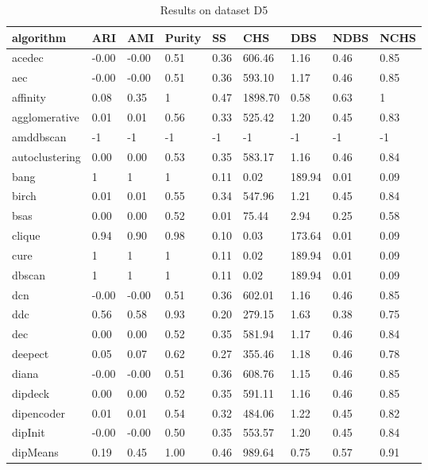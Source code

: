 \begin{table}[H]
\centering
\caption{Results on dataset D5}
\label{tab:params:D5}
\begin{tabular}{|l|l|l|l|l|l|l|l|l|}
\hline
algorithm & ARI & AMI & Purity & SS & CHS & DBS & NDBS & NCHS \\
\hline
acedec & -0.00 & -0.00 & 0.51 & 0.36 & 606.46 & 1.16 & 0.46 & 0.85 \\
\hline
aec & -0.00 & -0.00 & 0.51 & 0.36 & 593.10 & 1.17 & 0.46 & 0.85 \\
\hline
affinity & 0.08 & 0.35 & 1 & 0.47 & 1898.70 & 0.58 & 0.63 & 1 \\
\hline
agglomerative & 0.01 & 0.01 & 0.56 & 0.33 & 525.42 & 1.20 & 0.45 & 0.83 \\
\hline
amddbscan & -1 & -1 & -1 & -1 & -1 & -1 & -1 & -1 \\
\hline
autoclustering & 0.00 & 0.00 & 0.53 & 0.35 & 583.17 & 1.16 & 0.46 & 0.84 \\
\hline
bang & 1 & 1 & 1 & 0.11 & 0.02 & 189.94 & 0.01 & 0.09 \\
\hline
birch & 0.01 & 0.01 & 0.55 & 0.34 & 547.96 & 1.21 & 0.45 & 0.84 \\
\hline
bsas & 0.00 & 0.00 & 0.52 & 0.01 & 75.44 & 2.94 & 0.25 & 0.58 \\
\hline
clique & 0.94 & 0.90 & 0.98 & 0.10 & 0.03 & 173.64 & 0.01 & 0.09 \\
\hline
cure & 1 & 1 & 1 & 0.11 & 0.02 & 189.94 & 0.01 & 0.09 \\
\hline
dbscan & 1 & 1 & 1 & 0.11 & 0.02 & 189.94 & 0.01 & 0.09 \\
\hline
dcn & -0.00 & -0.00 & 0.51 & 0.36 & 602.01 & 1.16 & 0.46 & 0.85 \\
\hline
ddc & 0.56 & 0.58 & 0.93 & 0.20 & 279.15 & 1.63 & 0.38 & 0.75 \\
\hline
dec & 0.00 & 0.00 & 0.52 & 0.35 & 581.94 & 1.17 & 0.46 & 0.84 \\
\hline
deepect & 0.05 & 0.07 & 0.62 & 0.27 & 355.46 & 1.18 & 0.46 & 0.78 \\
\hline
diana & -0.00 & -0.00 & 0.51 & 0.36 & 608.76 & 1.15 & 0.46 & 0.85 \\
\hline
dipdeck & 0.00 & 0.00 & 0.52 & 0.35 & 591.11 & 1.16 & 0.46 & 0.85 \\
\hline
dipencoder & 0.01 & 0.01 & 0.54 & 0.32 & 484.06 & 1.22 & 0.45 & 0.82 \\
\hline
dipInit & -0.00 & -0.00 & 0.50 & 0.35 & 553.57 & 1.20 & 0.45 & 0.84 \\
\hline
dipMeans & 0.19 & 0.45 & 1.00 & 0.46 & 989.64 & 0.75 & 0.57 & 0.91 \\

\end{tabular}
\end{table}
